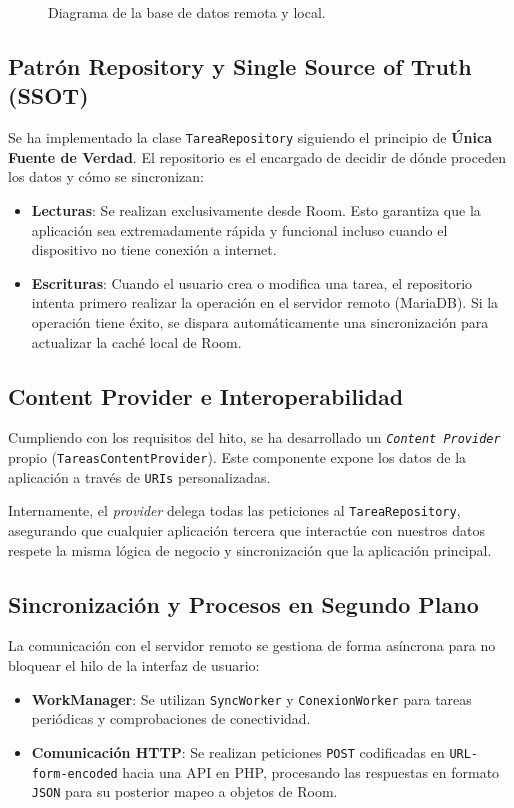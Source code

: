 \documentclass{article}
\begin{document}
\begin{figure}[H]
    \centering
    
    \caption{Diagrama de la base de datos remota y local.}
    \label{fig:esquema_db}
\end{figure}

\subsection{Patrón Repository y Single Source of Truth (SSOT)}

Se ha implementado la clase \texttt{TareaRepository} siguiendo el principio de \textbf{Única Fuente de Verdad}. El repositorio es el encargado de decidir de dónde proceden los datos y cómo se sincronizan:
\begin{itemize}
    \item \textbf{Lecturas}: Se realizan exclusivamente desde Room. Esto garantiza que la aplicación sea extremadamente rápida y funcional incluso cuando el dispositivo no tiene conexión a internet.
    \item \textbf{Escrituras}: Cuando el usuario crea o modifica una tarea, el repositorio intenta primero realizar la operación en el servidor remoto (MariaDB). Si la operación tiene éxito, se dispara automáticamente una sincronización para actualizar la caché local de Room.
\end{itemize}

\subsection{Content Provider e Interoperabilidad}

Cumpliendo con los requisitos del hito, se ha desarrollado un \texttt{\textit{Content Provider}} propio (\texttt{TareasContentProvider}). Este componente expone los datos de la aplicación a través de \texttt{URIs} personalizadas.

Internamente, el \textit{provider} delega todas las peticiones al \texttt{TareaRepository}, asegurando que cualquier aplicación tercera que interactúe con nuestros datos respete la misma lógica de negocio y sincronización que la aplicación principal.

\subsection{Sincronización y Procesos en Segundo Plano}

La comunicación con el servidor remoto se gestiona de forma asíncrona para no bloquear el hilo de la interfaz de usuario:
\begin{itemize}
    \item \textbf{WorkManager}: Se utilizan \texttt{SyncWorker} y \texttt{ConexionWorker} para tareas periódicas y comprobaciones de conectividad.
    \item \textbf{Comunicación HTTP}: Se realizan peticiones \texttt{POST} codificadas en \texttt{URL-form-encoded} hacia una API en PHP, procesando las respuestas en formato \texttt{JSON} para su posterior mapeo a objetos de Room.
\end{itemize}
\end{document}
